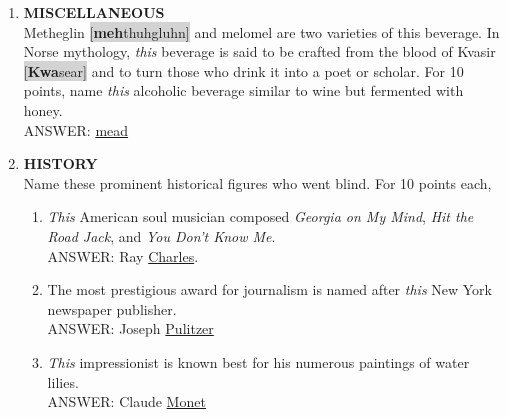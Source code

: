 \documentclass{report}
\newcommand*{\backtrack}{\setcounter{enumi}{\numexpr\theenumi-1\relax}}
\begin{document}
\begin{enumerate}
    \item \textbf{MISCELLANEOUS} \\ Metheglin \colorbox{lightGray}{[\textbf{meh}\textperiodcentered thuh\textperiodcentered gluhn]} and melomel are two varieties of this beverage. In Norse mythology, \textit{this} beverage is said to be crafted from the blood of Kvasir \colorbox{lightGray}{[\textbf{Kwa}\textperiodcentered sear]} and to turn those who drink it into a poet or scholar. For 10 points, name \textit{this} alcoholic beverage similar to wine but fermented with honey.\\ ANSWER: \underline{mead} \backtrack
    \item \textbf{HISTORY} \\ Name these prominent historical figures who went blind. For 10 points each,
    \begin{enumerate}[label=\Alph*]
        \item \textit{This} American soul musician composed \textit{Georgia on My Mind}, \textit{Hit the Road Jack}, and \textit{You Don't Know Me}. \\ ANSWER: Ray \underline{Charles}.
        \item The most prestigious award for journalism is named after \textit{this} New York newspaper publisher. \\ ANSWER: Joseph \underline{Pulitzer}
        \item \textit{This} impressionist is known best for his numerous paintings of water lilies. \\ ANSWER: Claude \underline{Monet}
    \end{enumerate}


\end{enumerate}
\end{document}
